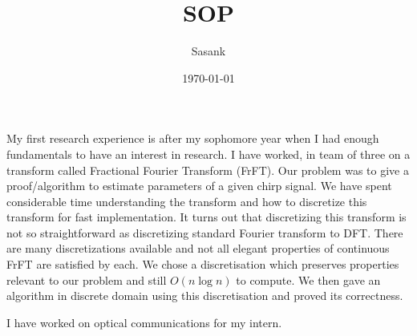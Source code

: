 \documentclass[a4paper]{article}
\begin{document}
\title{SOP}
\author{Sasank}
\date{\today}
\maketitle

My first research experience is after my sophomore year when I had enough fundamentals to have an interest in research. 
I have worked, in team of three on a transform called Fractional Fourier Transform (FrFT).
Our problem was to give a proof/algorithm to estimate parameters of a given chirp signal. 
We have spent considerable time understanding the transform and how to discretize this transform for fast implementation. 
It turns out that discretizing this transform is not so straightforward as discretizing standard Fourier transform to DFT. There are many discretizations available and not all elegant properties of continuous FrFT are satisfied by each. 
We chose a discretisation which preserves properties relevant to our problem and still $O(n\log n)$ to compute. We then gave an algorithm in discrete domain using this discretisation and proved its correctness.


I have worked on optical communications for my intern. 
\end{document}

